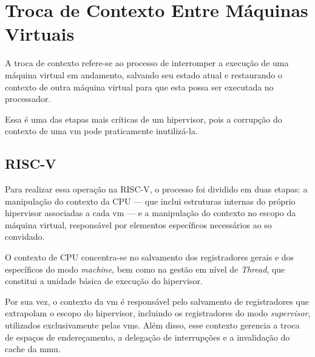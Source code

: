 \section{Troca de Contexto Entre Máquinas Virtuais}

A troca de contexto refere-se ao processo de interromper a execução de uma máquina virtual em andamento,
salvando seu estado atual e restaurando o contexto de outra máquina virtual para que esta possa ser executada no processador.

Essa é uma das etapas mais críticas de um hipervisor, pois a corrupção do contexto de uma \gls{vm} pode praticamente inutilizá-la.

\subsection{RISC-V}

Para realizar essa operação na RISC-V, o processo foi dividido em duas etapas: a manipulação do contexto da CPU —
que inclui estruturas internas do próprio hipervisor associadas a cada \gls{vm} — e a manipulação do contexto no escopo da
máquina virtual, responsável por elementos específicos necessários ao \gls{so} convidado.

O contexto de CPU concentra-se no salvamento dos registradores gerais e dos  específicos do modo \textit{machine},
bem como na gestão em nível de \textit{Thread}, que constitui a unidade básica de execução do hipervisor.

Por sua vez, o contexto da \gls{vm} é responsável pelo salvamento de registradores que extrapolam o escopo do hipervisor,
incluindo os registradores do modo \textit{supervisor}, utilizados exclusivamente pelas \glspl{vm}.
Além disso, esse contexto gerencia a troca de espaços de endereçamento, a delegação de interrupções e a
invalidação do cache da \gls{mmu}.

